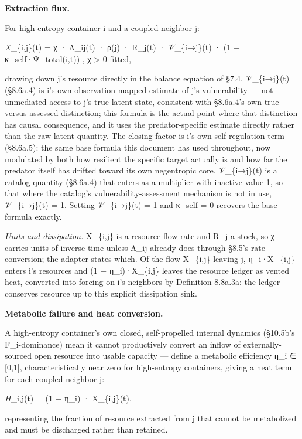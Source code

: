 \documentclass[
]{article}
\begin{document}
\textbf{Extraction flux.}

For high-entropy container i and a coupled neighbor j:

\emph{X}\_\{i,j\}(t) = χ · Λ\_ij(t) · ρ(j) · R\_j(t) · 𝒱\_\{i→j\}(t) ·
(1 − κ\_self·Ψ\_total(i,t))₊, χ \textgreater{} 0 fitted,

drawing down j's resource directly in the balance equation of §7.4.
𝒱\_\{i→j\}(t) (§8.6a.4) is i's own observation-mapped estimate of j's
vulnerability --- not unmediated access to j's true latent state,
consistent with §8.6a.4's own true-versus-assessed distinction; this
formula is the actual point where that distinction has causal
consequence, and it uses the predator-specific estimate directly rather
than the raw latent quantity. The closing factor is i's own
self-regulation term (§8.6a.5): the same base formula this document has
used throughout, now modulated by both how resilient the specific target
actually is and how far the predator itself has drifted toward its own
negentropic core. 𝒱\_\{i→j\}(t) is a catalog quantity (§8.6a.4) that
enters as a multiplier with inactive value 1, so that where the
catalog's vulnerability-assessment mechanism is not in use,
𝒱\_\{i→j\}(t) = 1. Setting 𝒱\_\{i→j\}(t) = 1 and κ\_self = 0 recovers
the base formula exactly.

\emph{Units and dissipation.} X\_\{i,j\} is a resource-flow rate and
R\_j a stock, so χ carries units of inverse time unless Λ\_ij already
does through §8.5's rate conversion; the adapter states which. Of the
flow X\_\{i,j\} leaving j, η\_i·X\_\{i,j\} enters i's resources and (1 −
η\_i)·X\_\{i,j\} leaves the resource ledger as vented heat, converted
into forcing on i's neighbors by Definition 8.8a.3a: the ledger
conserves resource up to this explicit dissipation sink.

\textbf{Metabolic failure and heat conversion.}

A high-entropy container's own closed, self-propelled internal dynamics
(§10.5b's F\_i-dominance) mean it cannot productively convert an inflow
of externally-sourced open resource into usable capacity --- define a
metabolic efficiency η\_i ∈ {[}0,1{]}, characteristically near zero for
high-entropy containers, giving a heat term for each coupled neighbor j:

\emph{H}\_i,j(t) = (1 − η\_i) · X\_\{i,j\}(t),

representing the fraction of resource extracted from j that cannot be
metabolized and must be discharged rather than retained.
\end{document}
